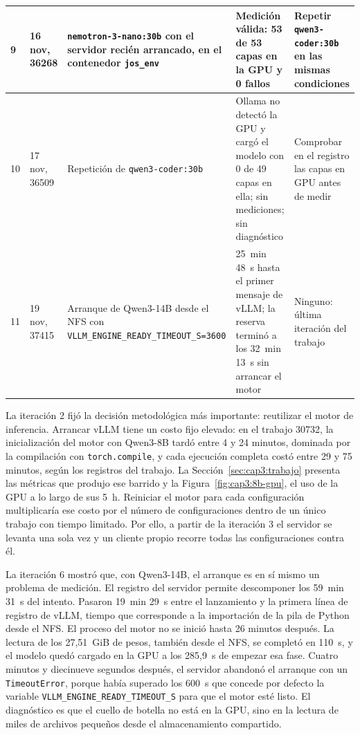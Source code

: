 \begin{table}[htbp]
\begin{tabular}{|p{}|p{}|p{}|p{}|p{}|}
    \hline
    9 & 16 nov, 36268 & \texttt{nemotron-3-\allowbreak nano:\allowbreak 30b} con el servidor recién arrancado, en el contenedor \texttt{jos\_env} & Medición válida: 53 de 53 capas en la GPU y 0 fallos & Repetir \texttt{qwen3-\allowbreak coder:\allowbreak 30b} en las mismas condiciones \\
    \hline
    10 & 17 nov, 36509 & Repetición de \texttt{qwen3-\allowbreak coder:\allowbreak 30b} & Ollama no detectó la GPU y cargó el modelo con 0 de 49 capas en ella; sin mediciones; sin diagnóstico & Comprobar en el registro las capas en GPU antes de medir \\
    \hline
    11 & 19 nov, 37415 & Arranque de Qwen3-14B desde el NFS con \texttt{VLLM\_\allowbreak ENGINE\_\allowbreak READY\_\allowbreak TIMEOUT\_\allowbreak S=3600} & 25~min 48~s hasta el primer mensaje de vLLM; la reserva terminó a los 32~min 13~s sin arrancar el motor & Ninguno: última iteración del trabajo \\
    \hline
  \end{tabular}
\end{table}

La iteración 2 fijó la decisión metodológica más importante: reutilizar el motor de inferencia. Arrancar vLLM tiene un costo fijo elevado: en el trabajo 30732, la inicialización del motor con Qwen3-8B tardó entre 4 y 24 minutos, dominada por la compilación con \texttt{torch.\allowbreak compile}, y cada ejecución completa costó entre 29 y 75 minutos, según los registros del trabajo. La Sección~\ref{sec:cap3:trabajo} presenta las métricas que produjo ese barrido y la Figura~\ref{fig:cap3:8b-gpu}, el uso de la GPU a lo largo de sus 5~h. Reiniciar el motor para cada configuración multiplicaría ese costo por el número de configuraciones dentro de un único trabajo con tiempo limitado. Por ello, a partir de la iteración 3 el servidor se levanta una sola vez y un cliente propio recorre todas las configuraciones contra él.

La iteración 6 mostró que, con Qwen3-14B, el arranque es en sí mismo un problema de medición. El registro del servidor permite descomponer los 59~min 31~s del intento. Pasaron 19~min 29~s entre el lanzamiento y la primera línea de registro de vLLM, tiempo que corresponde a la importación de la pila de Python desde el NFS. El proceso del motor no se inició hasta 26 minutos después. La lectura de los 27,51~GiB de pesos, también desde el NFS, se completó en 110~s, y el modelo quedó cargado en la GPU a los 285,9~s de empezar esa fase. Cuatro minutos y diecinueve segundos después, el servidor abandonó el arranque con un \texttt{TimeoutError}, porque había superado los 600~s que concede por defecto la variable \texttt{VLLM\_ENGINE\_READY\_TIMEOUT\_S} para que el motor esté listo. El diagnóstico es que el cuello de botella no está en la GPU, sino en la lectura de miles de archivos pequeños desde el almacenamiento compartido.

